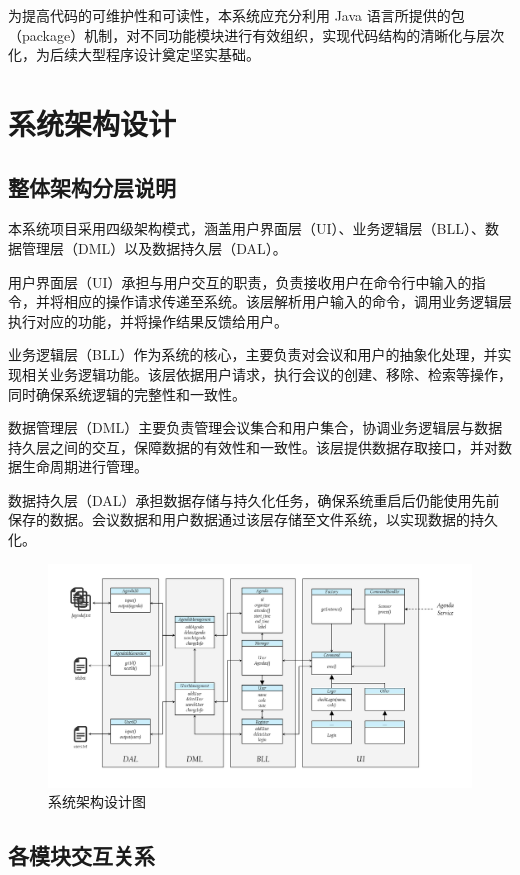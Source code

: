 \documentclass[a4paper, twoside, utf8]{ctexart}
\begin{document}
    为提高代码的可维护性和可读性，本系统应充分利用 Java 语言所提供的包（package）机制，对不同功能模块进行有效组织，实现代码结构的清晰化与层次化，为后续大型程序设计奠定坚实基础。

    \section{系统架构设计}

    \subsection{整体架构分层说明}

    本系统项目采用四级架构模式，涵盖用户界面层（UI）、业务逻辑层（BLL）、数据管理层（DML）以及数据持久层（DAL）。
    
    用户界面层（UI）承担与用户交互的职责，负责接收用户在命令行中输入的指令，并将相应的操作请求传递至系统。该层解析用户输入的命令，调用业务逻辑层执行对应的功能，并将操作结果反馈给用户。
    
    业务逻辑层（BLL）作为系统的核心，主要负责对会议和用户的抽象化处理，并实现相关业务逻辑功能。该层依据用户请求，执行会议的创建、移除、检索等操作，同时确保系统逻辑的完整性和一致性。
    
    数据管理层（DML）主要负责管理会议集合和用户集合，协调业务逻辑层与数据持久层之间的交互，保障数据的有效性和一致性。该层提供数据存取接口，并对数据生命周期进行管理。
    
    数据持久层（DAL）承担数据存储与持久化任务，确保系统重启后仍能使用先前保存的数据。会议数据和用户数据通过该层存储至文件系统，以实现数据的持久化。

    \begin{figure}
        \centering
        \includegraphics[width=.9\linewidth]{figure/structure.png}
        \caption{系统架构设计图}
    \end{figure}

    \subsection{各模块交互关系}
\end{document}
